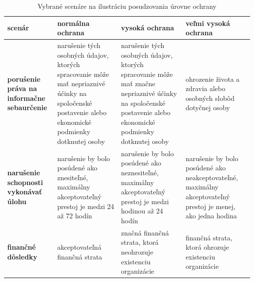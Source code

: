 \begin{table}[h!]
    \caption{Vybrané scenáre na ilustráciu posudzovania úrovne ochrany}
    \label{tab:protectionscenario}
    \begin{center}
            \begin{tabularx}{\textwidth}{|>{\raggedright\arraybackslash}p{2.8cm}
                                  |>{\raggedright\arraybackslash}X
                                  |>{\raggedright\arraybackslash}X
                                  |>{\raggedright\arraybackslash}X|}
            \hline
            \textbf{scenár} & \textbf{normálna ochrana} & \textbf{vysoká ochrana} & \textbf{veľmi vysoká ochrana}
            \\
            \hline
            \hline
            \textbf{porušenie práva na informačne sebaurčenie}
             &
            narušenie tých osobných údajov, ktorých spracovanie môže mať nepriaznivé účinky na spoločenské postavenie alebo ekonomické podmienky dotknutej osoby
             &
            narušenie tých osobných údajov, ktorých spracovanie môže mať značne nepriaznivé účinky na spoločenské postavenie alebo ekonomické podmienky dotknutej osoby
             &
            ohrozenie života a zdravia alebo osobných slobôd dotyčnej osoby
            \\
            \hline
            \textbf{narušenie schopnosti vykonávať úlohu}
             &
            narušenie by bolo posúdené ako znesiteľné, maximálny akceptovateľný prestoj je medzi 24 až 72 hodín
             &
            narušenie by bolo posúdené ako neznesiteľné, maximálny akceptovateľný prestoj je medzi hodinou až 24 hodín
             &
            narušenie by bolo posúdené ako neakceptovateľné, maximálny akceptovateľný prestoj je menej, ako jedna hodina
            \\
            \hline
            \textbf{finančné dôsledky}
             &
            akceptovateľná finančná strata
             &
            značná finančná strata, ktorá neohrozuje existenciu organizácie
             &
            finančná strata, ktorá ohrozuje existenciu organizácie
            \\
            \hline
        \end{tabularx}
    \end{center}
\end{table}


